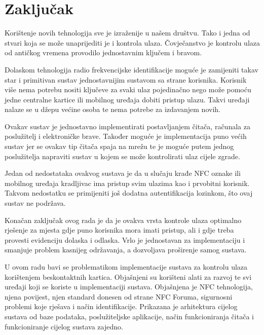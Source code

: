 \documentclass[times, utf8, zavrsni]{fer}
\begin{document}
\chapter{Zaključak}
Korištenje novih tehnologija sve je izraženije u našem društvu. Tako i jedna od stvari koja se može unaprijediti je i kontrola ulaza. Čovječanstvo je kontrolu ulaza od antičkog vremena provodilo jednostavnim ključem i bravom.\par
Dolaskom tehnologija radio frekvencijske identifikacije moguće je zamijeniti takav star i primitivan sustav jednostavnijim sustavom sa strane korisnika. Korisnik više nema potrebu nositi ključeve za svaki ulaz pojedinačno nego može pomoću jedne centralne kartice ili mobilnog uređaja dobiti pristup ulazu. Takvi uređaji nalaze se u džepu većine osoba te nema potrebe za izdavanjem novih.\par
Ovakav sustav je jednostavno implementirati postavljanjem čitača, računala za poslužitelj i elektroničke brave. Također moguće je implementacija puno većih sustav jer se ovakav tip čitača spaja na mrežu te je moguće putem jednog poslužitelja napraviti sustav u kojem se može kontrolirati ulaz cijele zgrade.\par
Jedan od nedostataka ovakvog sustava je da u slučaju krađe NFC oznake ili mobilnog uređaja kradljivac ima pristup svim ulazima kao i prvobitni korisnik. Takvom nedostatku se primijeniti još dodatna autentifikacija lozinkom, što ovaj sustav ne podržava.\par
Konačan zaključak ovog rada je da je ovakva vrsta kontrole ulaza optimalno rješenje za mjesta gdje puno korisnika mora imati pristup, ali i gdje treba provesti evidenciju dolaska i odlaska. Vrlo je jednostavan za implementaciju i smanjuje problem kasnijeg održavanja, a dozvoljava proširenje samog sustava.





\begin{sazetak}
U ovom radu bavi se problematikom implementacije sustava za kontrolu ulaza korištenjem beskontaktnih kartica. Objašnjeni su korišteni alati za razvoj te svi uređaji koji se koriste u implementaciji sustava. Objašnjena je NFC tehnologija, njena povijest, njen standard donesen od strane NFC Foruma, sigurnosni problemi koje rješava i način identifikacije. Prikazana je arhitektura cijelog sustava od baze podataka, poslužiteljske aplikacije, način funkcioniranja čitača i funkcioniranje cijelog sustava zajedno.

\end{sazetak}
\end{document}
